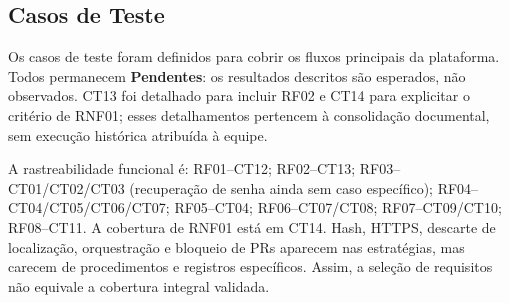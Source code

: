 \subsection{Casos de Teste} %

Os casos de teste foram definidos para cobrir os fluxos principais da plataforma. Todos permanecem \textbf{Pendentes}: os resultados descritos são esperados, não observados. CT13 foi detalhado para incluir RF02 e CT14 para explicitar o critério de RNF01; esses detalhamentos pertencem à consolidação documental, sem execução histórica atribuída à equipe.

A rastreabilidade funcional é: RF01--CT12; RF02--CT13; RF03--CT01/CT02/CT03 (recuperação de senha ainda sem caso específico); RF04--CT04/CT05/CT06/CT07; RF05--CT04; RF06--CT07/CT08; RF07--CT09/CT10; RF08--CT11. A cobertura de RNF01 está em CT14. Hash, HTTPS, descarte de localização, orquestração e bloqueio de PRs aparecem nas estratégias, mas carecem de procedimentos e registros específicos. Assim, a seleção de requisitos não equivale a cobertura integral validada.

